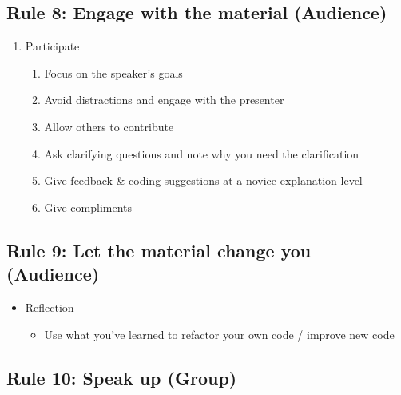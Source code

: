 \documentclass[
  11pt,
]{article}
\providecommand{\tightlist}{%
  \setlength{\itemsep}{0pt}\setlength{\parskip}{0pt}}
\begin{document}
\hypertarget{rule-8-engage-with-the-material-audience}{%
\subsection{Rule 8: Engage with the material
(Audience)}\label{rule-8-engage-with-the-material-audience}}

\begin{enumerate}
\def\labelenumi{\arabic{enumi}.}
\setcounter{enumi}{2}
\tightlist
\item
  Participate

  \begin{enumerate}
  \def\labelenumii{\alph{enumii}.}
  \tightlist
  \item
    Focus on the speaker's goals
  \item
    Avoid distractions and engage with the presenter
  \item
    Allow others to contribute
  \item
    Ask clarifying questions and note why you need the clarification
  \item
    Give feedback \& coding suggestions at a novice explanation level
  \item
    Give compliments
  \end{enumerate}
\end{enumerate}

\hypertarget{rule-9-let-the-material-change-you-audience}{%
\subsection{Rule 9: Let the material change you
(Audience)}\label{rule-9-let-the-material-change-you-audience}}

\begin{itemize}
\tightlist
\item
  Reflection

  \begin{itemize}
  \tightlist
  \item
    Use what you've learned to refactor your own code / improve new code
  \end{itemize}
\end{itemize}

\hypertarget{rule-10-speak-up-group}{%
\subsection{Rule 10: Speak up (Group)}\label{rule-10-speak-up-group}}
\end{document}

